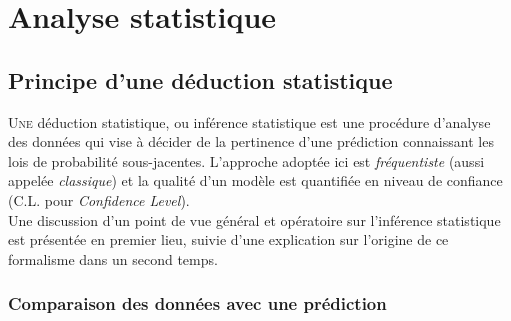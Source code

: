 

\chapter{Analyse statistique}
\label{chap:chapitre_stat}


\minitoc

\newpage

\section{Principe d'une déduction statistique}

\lettrine{U}{ne} déduction statistique, ou inférence statistique est une procédure d'analyse des données qui vise à décider de la pertinence d'une prédiction connaissant les lois de probabilité sous-jacentes. L'approche adoptée ici est \textit{fréquentiste} (aussi appelée \textit{classique}) et la qualité d'un modèle est quantifiée en niveau de confiance (\og C.L. \fg{} pour \textit{Confidence Level}).\\

Une discussion d'un point de vue général et opératoire sur l'inférence statistique est présentée en premier lieu, suivie d'une explication sur l'origine de ce formalisme dans un second temps.

\bigbreak

\subsection{Comparaison des données avec une prédiction}

